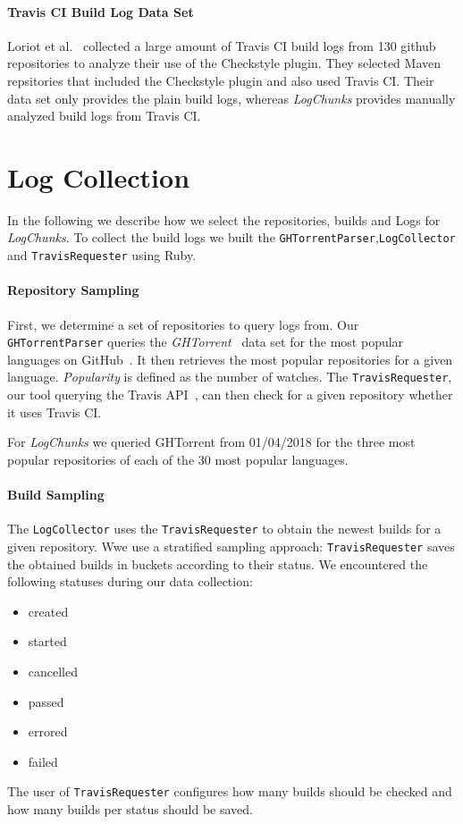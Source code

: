 \documentclass[\myrootdir/main.tex]{subfiles}
\begin{document}
\paragraph{Travis CI Build Log Data Set}
Loriot et al.~\cite{loriot2019dataset, loriot2019styler} collected a large amount of Travis CI build logs from 130 github repositories to analyze their use of the Checkstyle plugin.
They selected Maven repsitories that included the Checkstyle plugin and also used Travis CI.
Their data set only provides the plain build logs, whereas \emph{LogChunks} provides manually analyzed build logs from Travis CI.

\section{Log Collection}
In the following we describe how we select the repositories, builds and Logs for \emph{LogChunks}.
To collect the build logs we built the  \texttt{GHTorrentParser},\texttt{LogCollector} and \texttt{TravisRequester} using Ruby.

\paragraph{Repository Sampling}
First, we determine a set of repositories to query logs from.
Our \texttt{GHTorrentParser} queries the \emph{GHTorrent}~\cite{gousios2013ghtorrent} data set for the most popular languages on GitHub~\cite{github2019website}.
It then retrieves the most popular repositories for a given language.
\emph{Popularity} is defined as the number of watches.
The \texttt{TravisRequester}, our tool querying the Travis API~\cite{travisci2019apidoc}, can then check for a given repository whether it uses Travis CI.

For \emph{LogChunks} we queried GHTorrent from 01/04/2018 for the three most popular repositories of each of the 30 most popular languages.

\paragraph{Build Sampling}
The \texttt{LogCollector} uses the \texttt{TravisRequester} to obtain the newest builds for a given repository.
Wwe use a stratified sampling approach: \texttt{TravisRequester} saves the obtained builds in buckets according to their status.
We encountered the following statuses during our data collection:
\begin{itemize}
	\item created
	\item started
	\item cancelled
	\item passed
	\item errored
	\item failed
\end{itemize}
The user of \texttt{TravisRequester} configures how many builds should be checked and how many builds per status should be saved.
\end{document}
